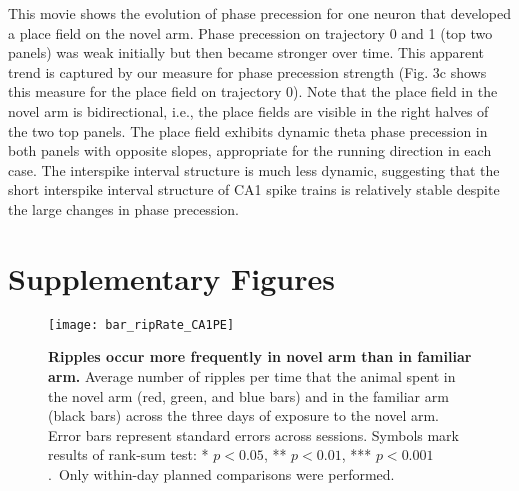 \documentclass[preprint,rmp,preprintnumbers,floatfix]{revtex4}
\newcommand{\pvallt}[1]{$p < #1$}
\newcommand{\ranksum}{Symbols mark results of rank-sum test:  * \pvallt{0.05},
** \pvallt{0.01}, *** \pvallt{0.001}.\ }
\begin{document}
This movie shows the evolution of phase precession for one neuron that developed
a place field on the novel arm.  Phase precession on trajectory 0 and 1 (top two
panels) was weak initially but then became stronger over time. This apparent
trend is captured by our measure for phase precession strength (Fig. 3c shows
this measure for the place field on trajectory 0). Note that the place field in
the novel arm is bidirectional, i.e., the place fields are visible in the right
halves of the two top panels. The place field exhibits dynamic theta phase
precession in both panels with opposite slopes, appropriate for the running
direction in each case.  The interspike interval structure is much less dynamic,
suggesting that the short interspike interval structure of CA1 spike trains is
relatively stable despite the large changes in phase precession.  

\begin{widetext}
\end{widetext}
\mbox{}

\clearpage
\section*{\large Supplementary Figures}

\setcounter{figure}{0}
\renewcommand\thefigure{{S\arabic{figure}}}

\begin{figure}[htbp]
    \centering
        \texttt{[image: bar\_ripRate\_CA1PE]}
    \caption{ {\bf Ripples occur more frequently in novel arm than in familiar
    arm.} 
    Average number of ripples per time that the animal spent in the novel
    arm (red, green, and blue bars) and in the familiar arm (black bars) across
    the three days of exposure to the novel arm. Error bars represent standard
    errors across sessions. \ranksum Only within-day planned comparisons were performed.
    }
\end{figure}
\end{document}
